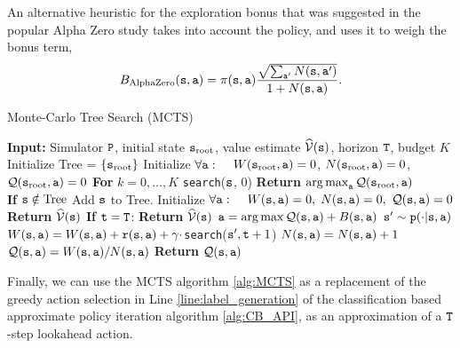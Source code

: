 An alternative heuristic for the exploration bonus that was suggested in the popular Alpha Zero study takes into account the policy, and uses it to weigh the bonus term, 
\begin{equation*}
    B_{\textrm{AlphaZero}}({\tt s},{\tt a}) = \pi({\tt s},{\tt a})\frac{\sqrt{\sum_{{\tt a}'} N({\tt s},{\tt a}')}}{1+N({\tt s},{\tt a})}.
\end{equation*}

\begin{algorithm}[H]
\caption{Monte-Carlo Tree Search (MCTS)}\label{alg:MCTS}
\begin{algorithmic}[1]
\State \textbf{Input:} Simulator ${\tt P}$, initial state ${\tt s}_{\textrm{root}}$, value estimate $\widehat{\mathcal{V}}({\tt s})$, horizon ${\tt T}$, budget $K$
\State Initialize Tree = $\{ {\tt s}_{\textrm{root}}\}$
\State Initialize $\forall {\tt a}: \quad $ $W({\tt s}_{\textrm{root}},{\tt a}) = 0$, $N({\tt s}_{\textrm{root}},{\tt a}) = 0$, 
$\mathcal{Q}({\tt s}_{\textrm{root}},{\tt a}) = 0$ 
\State \textbf{For} {$k = 0,\dots,K$ }
\State \quad \texttt{search}(${\tt s}$, 0)
\State \textbf{Return} $\argmax_\action \QValue(\state_{\textrm{root}},\action)$
\\
\State \quad \textbf{If} ${\tt s} \notin \textrm{Tree}$
\State \quad \quad Add ${\tt s}$ to Tree.
\State \quad \quad Initialize $\forall {\tt a}: \quad $ $W({\tt s},{\tt a}) = 0,$ 
$N({\tt s},{\tt a}) = 0,$ 
$\mathcal{Q}({\tt s},{\tt a}) = 0$ 
\State \quad \quad \textbf{Return} $\widehat{\mathcal{V}}({\tt s})$
\State \quad \textbf{If} ${\tt t} = {\tt T}$:
\State \quad \quad \textbf{Return} $\widehat{\mathcal{V}}({\tt s})$
\State \quad $\action = \argmax \QValue(\state, \action) + B(\state,\action)$
\State \quad ${\tt s}' \sim {\tt p}(\cdot|{\tt s},{\tt a})$
\State \quad $W({\tt s},{\tt a}) = W({\tt s},{\tt a}) + {\tt r}({\tt s},{\tt a}) + \gamma\cdot$\texttt{search}(${\tt s}', {\tt t}+1$)
\State \quad $N({\tt s},{\tt a}) = N({\tt s},{\tt a}) + 1$
\State \quad $\mathcal{Q}({\tt s}, {\tt a}) = W({\tt s},{\tt a}) / N({\tt s},{\tt a})$
\State \quad \textbf{Return} $\mathcal{Q}({\tt s}, {\tt a})$
\end{algorithmic}
\end{algorithm}

Finally, we can use the MCTS algorithm \ref{alg:MCTS} as a replacement of the greedy action selection in Line \ref{line:label_generation} of the classification based approximate policy iteration algorithm \ref{alg:CB_API}, as an approximation of a ${\tt T}$-step lookahead action.

